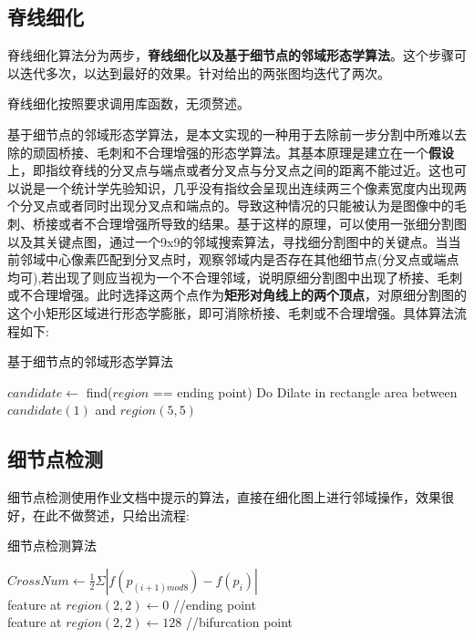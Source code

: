 \documentclass[UTF8]{ctexart}
\begin{document}
\subsection{脊线细化}
脊线细化算法分为两步，\textbf{脊线细化以及基于细节点的邻域形态学算法}。这个步骤可以迭代多次，以达到最好的效果。针对给出的两张图均迭代了两次。

脊线细化按照要求调用库函数，无须赘述。

基于细节点的邻域形态学算法，是本文实现的一种用于去除前一步分割中所难以去除的顽固桥接、毛刺和不合理增强的形态学算法。其基本原理是建立在一个\textbf{假设}上，即指纹脊线的分叉点与端点或者分叉点与分叉点之间的距离不能过近。这也可以说是一个统计学先验知识，几乎没有指纹会呈现出连续两三个像素宽度内出现两个分叉点或者同时出现分叉点和端点的。导致这种情况的只能被认为是图像中的毛刺、桥接或者不合理增强所导致的结果。基于这样的原理，可以使用一张细分割图以及其关键点图，通过一个9x9的邻域搜索算法，寻找细分割图中的关键点。当当前邻域中心像素匹配到分叉点时，观察邻域内是否存在其他细节点(分叉点或端点均可),若出现了则应当视为一个不合理邻域，说明原细分割图中出现了桥接、毛刺或不合理增强。此时选择这两个点作为\textbf{矩形对角线上的两个顶点}，对原细分割图的这个小矩形区域进行形态学膨胀，即可消除桥接、毛刺或不合理增强。具体算法流程如下:

\begin{algorithm}[H]
    \caption{基于细节点的邻域形态学算法}
    {
        {
            $candidate \leftarrow$ find($region$ == ending point)
        }
        {
            Do Dilate in rectangle area between $candidate(1)$ and $region(5,5)$
        }
    }
\end{algorithm}


\subsection{细节点检测}
细节点检测使用作业文档中提示的算法，直接在细化图上进行邻域操作，效果很好，在此不做赘述，只给出流程:

\begin{algorithm}[H]
    \caption{细节点检测算法}
    {
        {
            $CrossNum \leftarrow \frac{1}{2} \Sigma|f(p_{(i+1)mod8})-f(p_i)|$ \\

            {
                feature at $region(2,2) \leftarrow 0$ //ending point\\  
            }
            {
                feature at $region(2,2) \leftarrow 128$ //bifurcation point
            }
        }
    }
\end{algorithm}
\end{document}
